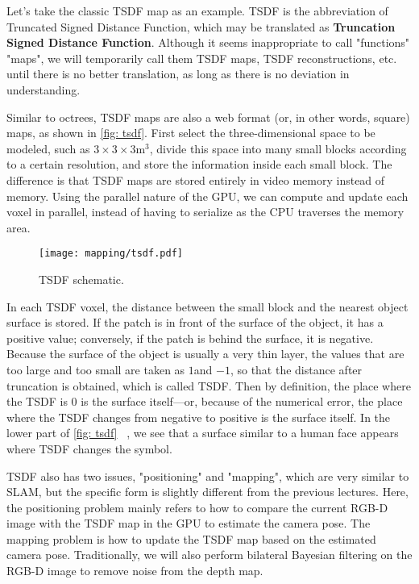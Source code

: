 Let's take the classic TSDF map as an example. TSDF is the abbreviation of Truncated Signed Distance Function, which may be translated as \textbf{Truncation Signed Distance Function}. Although it seems inappropriate to call "functions" "maps", we will temporarily call them TSDF maps, TSDF reconstructions, etc. until there is no better translation, as long as there is no deviation in understanding.

Similar to octrees, TSDF maps are also a web format (or, in other words, square) maps, as shown in \autoref{fig: tsdf}. First select the three-dimensional space to be modeled, such as $3 \times3 \times3 \text{m} ^ 3 $, divide this space into many small blocks according to a certain resolution, and store the information inside each small block. The difference is that TSDF maps are stored entirely in video memory instead of memory. Using the parallel nature of the GPU, we can compute and update each voxel in parallel, instead of having to serialize as the CPU traverses the memory area.

\begin{figure}[! t]
\centering
\texttt{[image: mapping/tsdf.pdf]}
\caption{TSDF schematic. }
\label{fig: tsdf}
\end{figure}

In each TSDF voxel, the distance between the small block and the nearest object surface is stored. If the patch is in front of the surface of the object, it has a positive value; conversely, if the patch is behind the surface, it is negative. Because the surface of the object is usually a very thin layer, the values ​​that are too large and too small are taken as $1 $and $-1 $, so that the distance after truncation is obtained, which is called TSDF. Then by definition, the place where the TSDF is 0 is the surface itself—or, because of the numerical error, the place where the TSDF changes from negative to positive is the surface itself. In the lower part of \autoref{fig: tsdf} ~, we see that a surface similar to a human face appears where TSDF changes the symbol.

\newpage
\enlargethispage{4pt}
TSDF also has two issues, "positioning" and "mapping", which are very similar to SLAM, but the specific form is slightly different from the previous lectures. Here, the positioning problem mainly refers to how to compare the current RGB-D image with the TSDF map in the GPU to estimate the camera pose. The mapping problem is how to update the TSDF map based on the estimated camera pose. Traditionally, we will also perform bilateral Bayesian filtering on the RGB-D image to remove noise from the depth map.

